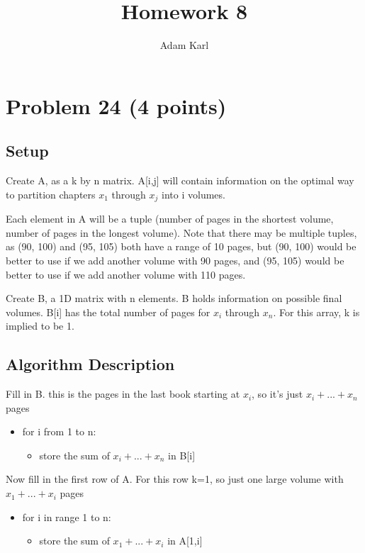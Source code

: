 \documentclass[a4paper]{article}
\title{Homework 8}
\author{Adam Karl}
\begin{document}
\maketitle

\section{Problem 24 (4 points)}
\subsection{Setup}

Create A, as a k by n matrix. A[i,j] will contain information on the optimal way to partition chapters $x_1$ through $x_j$ into i volumes.

Each element in A will be a tuple (number of pages in the shortest volume, number of pages in the longest volume). Note that there may be multiple tuples, as (90, 100) and (95, 105) both have a range of 10 pages, but (90, 100) would be better to use if we add another volume with 90 pages, and (95, 105) would be better to use if we add another volume with 110 pages.

Create B, a 1D matrix with n elements. B holds information on possible final volumes. B[i] has the total number of pages for $x_i$ through $x_n$. For this array, k is implied to be 1.

\subsection{Algorithm Description}
Fill in B. this is the pages in the last book starting at $x_i$, so it's just $x_i + ... + x_n$ pages
\begin{itemize}
    \item for i from 1 to n:
    \begin{itemize}
        \item store the sum of $x_i + ... + x_n$ in B[i]
    \end{itemize}
\end{itemize}

Now fill in the first row of A. For this row k=1, so just one large volume with $x_1 + ... + x_i$ pages

\begin{itemize}
    \item for i in range 1 to n:
    \begin{itemize}
        \item store the sum of $x_1 + ... + x_i$ in A[1,i]
    \end{itemize}
\end{itemize}
\end{document}
